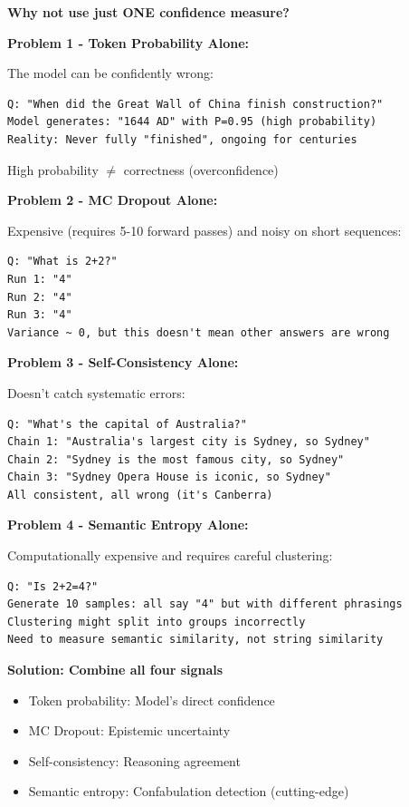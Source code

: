 \documentclass[12pt,a4paper]{article}
\theoremstyle{definition}
\begin{document}
\begin{whybox}
\textbf{Why not use just ONE confidence measure?}

\textbf{Problem 1 - Token Probability Alone:}

The model can be confidently wrong:
\begin{verbatim}
Q: "When did the Great Wall of China finish construction?"
Model generates: "1644 AD" with P=0.95 (high probability)
Reality: Never fully "finished", ongoing for centuries
\end{verbatim}

High probability $\neq$ correctness (overconfidence)

\textbf{Problem 2 - MC Dropout Alone:}

Expensive (requires 5-10 forward passes) and noisy on short sequences:
\begin{verbatim}
Q: "What is 2+2?"
Run 1: "4"
Run 2: "4"  
Run 3: "4"
Variance ~ 0, but this doesn't mean other answers are wrong
\end{verbatim}

\textbf{Problem 3 - Self-Consistency Alone:}

Doesn't catch systematic errors:
\begin{verbatim}
Q: "What's the capital of Australia?"
Chain 1: "Australia's largest city is Sydney, so Sydney"
Chain 2: "Sydney is the most famous city, so Sydney"  
Chain 3: "Sydney Opera House is iconic, so Sydney"
All consistent, all wrong (it's Canberra)
\end{verbatim}

\textbf{Problem 4 - Semantic Entropy Alone:}

Computationally expensive and requires careful clustering:
\begin{verbatim}
Q: "Is 2+2=4?"
Generate 10 samples: all say "4" but with different phrasings
Clustering might split into groups incorrectly
Need to measure semantic similarity, not string similarity
\end{verbatim}

\textbf{Solution: Combine all four signals}
\begin{itemize}
    \item Token probability: Model's direct confidence
    \item MC Dropout: Epistemic uncertainty
    \item Self-consistency: Reasoning agreement
    \item Semantic entropy: Confabulation detection (cutting-edge)
\end{itemize}
\end{whybox}
\end{document}
